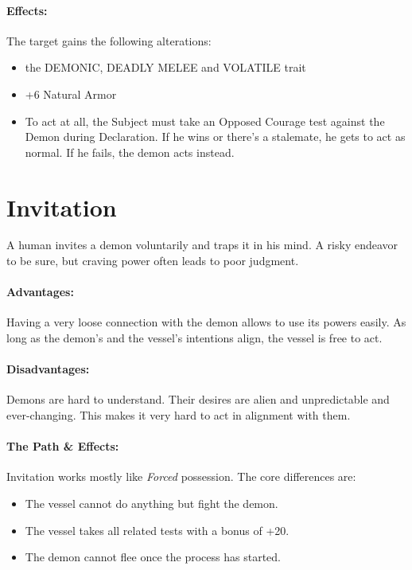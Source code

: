 \paragraph{Effects:}
The target gains the following alterations:
\begin{itemize}
	\vspace{-10mm}
	\setlength\itemsep{-10mm}
	\item the DEMONIC, DEADLY MELEE and VOLATILE trait
	\item +6 Natural Armor
	\item To act at all, the Subject must take an Opposed Courage test against the Demon during Declaration.
	If he wins or there's a stalemate, he gets to act as normal.
	If he fails, the demon acts instead.
\end{itemize}

\section{Invitation}
A human invites a demon voluntarily and traps it in his mind.
A risky endeavor to be sure,
but craving power often leads to poor judgment.
\paragraph{Advantages:}
Having a very loose connection with the demon allows to use its powers easily.
As long as the demon's and the vessel's intentions align,
the vessel is free to act.
\paragraph{Disadvantages:}
Demons are hard to understand.
Their desires are alien and unpredictable and ever-changing.
This makes it very hard to act in alignment with them.
\paragraph{The Path \& Effects:}
Invitation works mostly like \emph{Forced} possession.
The core differences are:
\begin{itemize}
	\setlength\itemsep{-8mm} \vspace{-8mm}
	\item The vessel cannot do anything but fight the demon.
	\item The vessel takes all related tests with a bonus of +20.
	\item The demon cannot flee once the process has started.
\end{itemize}


